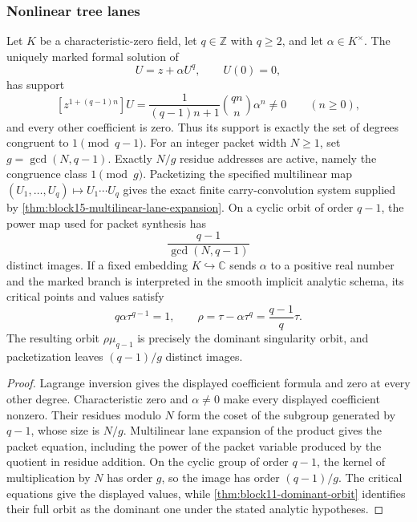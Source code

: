 \subsubsection{Nonlinear tree lanes}

\begin{proposition}
\label{prop:block15-tree-specialization}
Let \(K\) be a characteristic-zero field, let \(q\in\mathbb Z\) with
\(q\ge2\), and let
\(\alpha\in K^\times\).  The uniquely marked formal solution of
\[
 U=z+\alpha U^q,
 \qquad U(0)=0,
\]
has support
\[
 [z^{1+(q-1)n}]U
 =\frac{1}{(q-1)n+1}\binom{qn}{n}\alpha^n
 \ne0
 \qquad(n\ge0),
\]
and every other coefficient is zero.  Thus its support is exactly the set of
degrees congruent to \(1\pmod{q-1}\).
For an integer packet width \(N\ge1\), set
\(g=\gcd(N,q-1)\).  Exactly \(N/g\) residue addresses are active, namely
the congruence class \(1\pmod g\).  Packetizing the specified multilinear
map \((U_1,\ldots,U_q)\mapsto U_1\cdots U_q\) gives the exact finite
carry-convolution system supplied by
\cref{thm:block15-multilinear-lane-expansion}.  On a cyclic orbit of order
\(q-1\), the power map used for packet synthesis has
\[
 \frac{q-1}{\gcd(N,q-1)}
\]
distinct images.  If a fixed embedding \(K\hookrightarrow\mathbb C\) sends
\(\alpha\) to a positive real number and the marked branch is interpreted in
the smooth implicit analytic schema, its critical points and values satisfy
\[
 q\alpha\tau^{q-1}=1,
 \qquad
 \rho=\tau-\alpha\tau^q=\frac{q-1}{q}\tau.
\]
The resulting orbit \(\rho\mu_{q-1}\) is precisely the dominant singularity
orbit, and packetization leaves \((q-1)/g\) distinct images.
\end{proposition}

\begin{proof}
Lagrange inversion gives the displayed coefficient formula and zero at every
other degree.  Characteristic zero and \(\alpha\ne0\) make every displayed
coefficient nonzero.  Their residues modulo \(N\) form the coset of the subgroup
generated by \(q-1\), whose size is \(N/g\).  Multilinear lane expansion of
the product gives the packet equation, including the power of the packet
variable produced by the quotient in residue addition.  On the cyclic group
of order \(q-1\), the kernel of multiplication by \(N\) has order \(g\), so
the image has order \((q-1)/g\).  The critical equations give the displayed
values, while \cref{thm:block11-dominant-orbit} identifies their full orbit as
the dominant one under the stated analytic hypotheses.
\end{proof}

